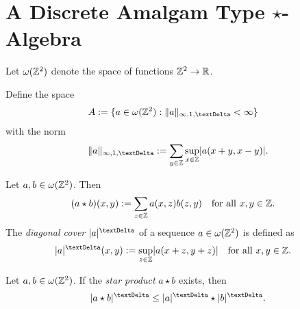 \section{A Discrete Amalgam Type $\star$-Algebra}
\label{lone}

Let $ \omega( \mathbb{ Z }^2 ) $ denote the space of functions $ \mathbb{ Z }^2 \to \mathbb{ R } $.

\begin{definition}
    Define the space
    \begin{align}
        A
        &:=
        \brmSet{ a \in \fsSeq( \nrZ^2 ) }{ \norm{ a }_{\infi,1,\tDe} < \infi }
    \end{align}
    with the norm
    \begin{align}
        \norm{ a }_{\infi,1,\tDe}
        :=
        \sum_{y\in\nrZ}\sup_{x\in\nrZ}\abs{a(x+y,x-y)}
        .
    \end{align}
\end{definition}

\begin{definition}
    Let $ a, b \in \omega( \mathbb{ Z }^2 ) $.
    Then
    \begin{align}
        ( a \star b )( x, y )
        &:=
        \sum_{z\in\mathbb{ Z }} a( x, z ) b( z, y )
        &&\text{for all $ x, y \in \mathbb{ Z } $.}
    \end{align}
    The {\em diagonal cover} $ \abs{a}^\tDe $
    of a sequence $ a \in \omega( \mathbb{ Z }^2 ) $ is defined as
    \begin{align}
        \abs{a}^\tDe( x, y )
        :=
        \sup_{z\in\nrZ}\abs{a(x+z,y+z)}
        &&&\text{for all $ x, y \in \nrZ $.}
    \end{align}
\end{definition}

\begin{lemma}
    \label{lem:sd}
    Let $ a, b \in \omega( \mathbb{ Z }^2 ) $.
    If the {\em star product} $ a \star b $ exists, then
    \begin{align}
        \absDi{ a \star b }
        \leq
        \absDi{ a } \star \absDi{ b }
        .
        \label{lem:sd:eq}
    \end{align}
\end{lemma}

